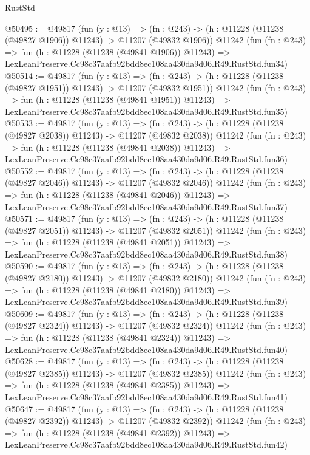 \begin{lexlean}{RustStd}
\begin{coremodule}
@50495 := @49817
    (fun (y : @13) =>
    (fn : @243) -> (h : @11228 (@11238 (@49827 @1906)) @11243) -> @11207 (@49832 @1906))
    @11242
    (fun (fn : @243) =>
    fun (h : @11228 (@11238 (@49841 @1906)) @11243) =>
    LexLeanPreserve.Cc98c37aafb92bdd8ec108aa430da9d06.R49.RustStd.fun34)
@50514 := @49817
    (fun (y : @13) =>
    (fn : @243) -> (h : @11228 (@11238 (@49827 @1951)) @11243) -> @11207 (@49832 @1951))
    @11242
    (fun (fn : @243) =>
    fun (h : @11228 (@11238 (@49841 @1951)) @11243) =>
    LexLeanPreserve.Cc98c37aafb92bdd8ec108aa430da9d06.R49.RustStd.fun35)
@50533 := @49817
    (fun (y : @13) =>
    (fn : @243) -> (h : @11228 (@11238 (@49827 @2038)) @11243) -> @11207 (@49832 @2038))
    @11242
    (fun (fn : @243) =>
    fun (h : @11228 (@11238 (@49841 @2038)) @11243) =>
    LexLeanPreserve.Cc98c37aafb92bdd8ec108aa430da9d06.R49.RustStd.fun36)
@50552 := @49817
    (fun (y : @13) =>
    (fn : @243) -> (h : @11228 (@11238 (@49827 @2046)) @11243) -> @11207 (@49832 @2046))
    @11242
    (fun (fn : @243) =>
    fun (h : @11228 (@11238 (@49841 @2046)) @11243) =>
    LexLeanPreserve.Cc98c37aafb92bdd8ec108aa430da9d06.R49.RustStd.fun37)
@50571 := @49817
    (fun (y : @13) =>
    (fn : @243) -> (h : @11228 (@11238 (@49827 @2051)) @11243) -> @11207 (@49832 @2051))
    @11242
    (fun (fn : @243) =>
    fun (h : @11228 (@11238 (@49841 @2051)) @11243) =>
    LexLeanPreserve.Cc98c37aafb92bdd8ec108aa430da9d06.R49.RustStd.fun38)
@50590 := @49817
    (fun (y : @13) =>
    (fn : @243) -> (h : @11228 (@11238 (@49827 @2180)) @11243) -> @11207 (@49832 @2180))
    @11242
    (fun (fn : @243) =>
    fun (h : @11228 (@11238 (@49841 @2180)) @11243) =>
    LexLeanPreserve.Cc98c37aafb92bdd8ec108aa430da9d06.R49.RustStd.fun39)
@50609 := @49817
    (fun (y : @13) =>
    (fn : @243) -> (h : @11228 (@11238 (@49827 @2324)) @11243) -> @11207 (@49832 @2324))
    @11242
    (fun (fn : @243) =>
    fun (h : @11228 (@11238 (@49841 @2324)) @11243) =>
    LexLeanPreserve.Cc98c37aafb92bdd8ec108aa430da9d06.R49.RustStd.fun40)
@50628 := @49817
    (fun (y : @13) =>
    (fn : @243) -> (h : @11228 (@11238 (@49827 @2385)) @11243) -> @11207 (@49832 @2385))
    @11242
    (fun (fn : @243) =>
    fun (h : @11228 (@11238 (@49841 @2385)) @11243) =>
    LexLeanPreserve.Cc98c37aafb92bdd8ec108aa430da9d06.R49.RustStd.fun41)
@50647 := @49817
    (fun (y : @13) =>
    (fn : @243) -> (h : @11228 (@11238 (@49827 @2392)) @11243) -> @11207 (@49832 @2392))
    @11242
    (fun (fn : @243) =>
    fun (h : @11228 (@11238 (@49841 @2392)) @11243) =>
    LexLeanPreserve.Cc98c37aafb92bdd8ec108aa430da9d06.R49.RustStd.fun42)

\end{coremodule}
\end{lexlean}
